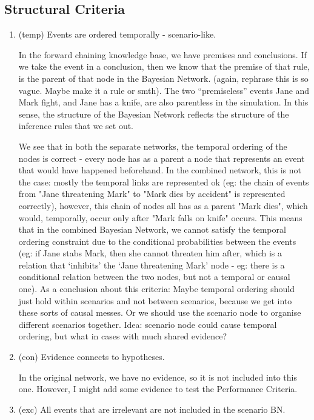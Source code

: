 \subsection{Structural Criteria}
\begin{enumerate}
\item (temp) Events are ordered temporally - scenario-like.

In the forward chaining knowledge base, we have premises and conclusions. If we take the event in a conclusion, then we know that the premise of that rule, is the parent of that node in the Bayesian Network. (again, rephrase this is so vague. Maybe make it a rule or smth). The two ``premiseless'' events Jane and Mark fight, and Jane has a knife, are also parentless in the simulation. In this sense, the structure of the Bayesian Network reflects the structure of the inference rules that we set out.

We see that in both the separate networks, the temporal ordering of the nodes is correct - every node has as a parent a node that represents an event that would have happened beforehand. In the combined network, this is not the case: mostly the temporal links are represented ok (eg: the chain of events from "Jane threatening Mark" to "Mark dies by accident" is represented correctly), however, this chain of nodes all has as a parent "Mark dies", which would, temporally, occur only after "Mark falls on knife" occurs. This means that in the combined Bayesian Network, we cannot satisfy the temporal ordering constraint due to the conditional probabilities between the events (eg: if Jane stabs Mark, then she cannot threaten him after, which is a relation that `inhibits' the `Jane threatening Mark' node - eg: there is a conditional relation between the two nodes, but not a temporal or causal one). As a conclusion about this criteria: Maybe temporal ordering should just hold within scenarios and not between scenarios, because we get into these sorts of causal messes. Or we should use the scenario node to organise different scenarios together. Idea: scenario node could cause temporal ordering, but what in cases with much shared evidence?

\item (con) Evidence connects to hypotheses.

In the original network, we have no evidence, so it is not included into this one. However, I might add some evidence to test the Performance Criteria.

\item (exc) All events that are irrelevant are not included in the scenario BN.


\end{enumerate}
